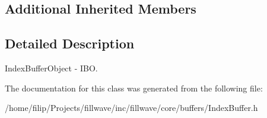 \subsection*{Additional Inherited Members}


\subsection{Detailed Description}
Index\+Buffer\+Object -\/ I\+B\+O. 

The documentation for this class was generated from the following file\+:\begin{DoxyCompactItemize}
\item 
/home/filip/\+Projects/fillwave/inc/fillwave/core/buffers/Index\+Buffer.\+h\end{DoxyCompactItemize}
